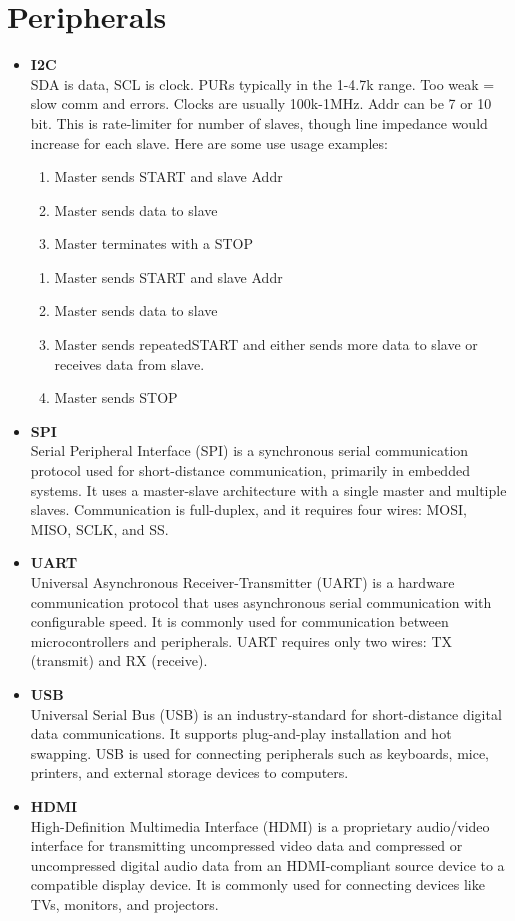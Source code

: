 \documentclass{article}
\begin{document}
\section{Peripherals}
\begin{itemize}
	\item \textbf{I2C}\\
	      SDA is data, SCL is clock. PURs typically in the 1-4.7k range. Too weak = slow comm and errors. Clocks are usually 100k-1MHz. Addr can be 7 or 10 bit. This is rate-limiter for number of slaves, though line impedance would increase for each slave. Here are some use usage examples:
	      \begin{enumerate}
		      \item Master sends START and slave Addr
		      \item Master sends data to slave
		      \item Master terminates with a STOP
	      \end{enumerate}
	      \begin{enumerate}
		      \item Master sends START and slave Addr
		      \item Master sends data to slave
		      \item Master sends repeatedSTART and either sends more data to slave or receives data from slave.
		      \item Master sends STOP
	      \end{enumerate}
	\item \textbf{SPI}\\
	      Serial Peripheral Interface (SPI) is a synchronous serial communication protocol used for short-distance communication, primarily in embedded systems. It uses a master-slave architecture with a single master and multiple slaves. Communication is full-duplex, and it requires four wires: MOSI, MISO, SCLK, and SS.
	\item \textbf{UART}\\
	      Universal Asynchronous Receiver-Transmitter (UART) is a hardware communication protocol that uses asynchronous serial communication with configurable speed. It is commonly used for communication between microcontrollers and peripherals. UART requires only two wires: TX (transmit) and RX (receive).
	\item \textbf{USB}\\
	      Universal Serial Bus (USB) is an industry-standard for short-distance digital data communications. It supports plug-and-play installation and hot swapping. USB is used for connecting peripherals such as keyboards, mice, printers, and external storage devices to computers.
	\item \textbf{HDMI}\\
	      High-Definition Multimedia Interface (HDMI) is a proprietary audio/video interface for transmitting uncompressed video data and compressed or uncompressed digital audio data from an HDMI-compliant source device to a compatible display device. It is commonly used for connecting devices like TVs, monitors, and projectors.
\end{itemize}
\end{document}
